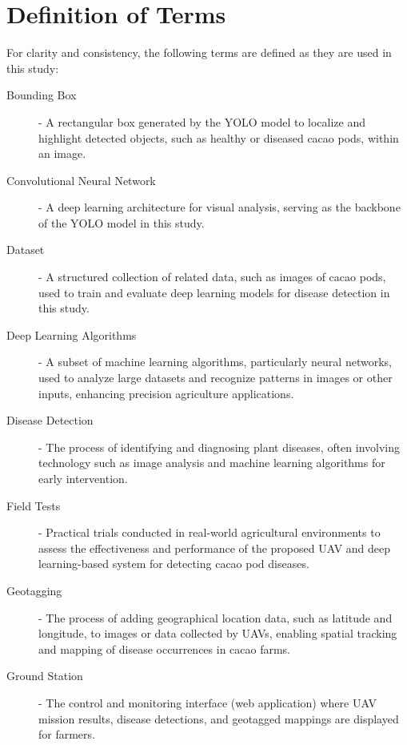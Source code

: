 {\section{Definition of Terms}

For clarity and consistency, the following terms are defined as they are used in this study:

\begin{description}
	\item[Bounding Box] - A rectangular box generated by the YOLO model to localize and highlight detected objects, such as healthy or diseased cacao pods, within an image.
	
	\item[Convolutional Neural Network] - A deep learning architecture for visual analysis, serving as the backbone of the YOLO model in this study.
	
	
	\item[Dataset] - A structured collection of related data, such as images of cacao pods, used to train and evaluate deep learning models for disease detection in this study.

	\item[Deep Learning Algorithms] - A subset of machine learning algorithms, particularly neural networks, used to analyze large datasets and recognize patterns in images or other inputs, enhancing precision agriculture applications.

	\item[Disease Detection] - The process of identifying and diagnosing plant diseases, often involving technology such as image analysis and machine learning algorithms for early intervention.

	\item[Field Tests] - Practical trials conducted in real-world agricultural environments to assess the effectiveness and performance of the proposed UAV and deep learning-based system for detecting cacao pod diseases.

	\item[Geotagging] - The process of adding geographical location data, such as latitude and longitude, to images or data collected by UAVs, enabling spatial tracking and mapping of disease occurrences in cacao farms.
	
	\item[Ground Station] - The control and monitoring interface (web application) where UAV mission results, disease detections, and geotagged mappings are displayed for farmers.
	

\end{description}}
